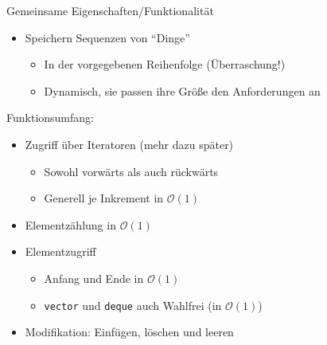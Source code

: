 \begin{frame}[fragile]{Gemeinsame Eigenschaften/Funktionalität}
	\begin{itemize}
		\item Speichern Sequenzen von \enquote{Dinge}
		\begin{itemize}
			\item In der vorgegebenen Reihenfolge (Überraschung!)
			\pause
			\item Dynamisch, sie passen ihre Größe den Anforderungen an
		\end{itemize}
	\end{itemize}
	
	\pause
	
	Funktionsumfang:
	\begin{itemize}
		\item Zugriff über Iteratoren (mehr dazu später)
		\begin{itemize}
			\item Sowohl vorwärts als auch rückwärts
			\item Generell je Inkrement in $\mathcal{O}(1)$
		\end{itemize}
		\item Elementzählung in $\mathcal{O}(1)$
		\item Elementzugriff
		\begin{itemize}
			\item Anfang und Ende in $\mathcal{O}(1)$
			\item \verb|vector| und \verb|deque| auch Wahlfrei (in $\mathcal{O}(1)$)
		\end{itemize}
		\item Modifikation: Einfügen, löschen und leeren
	\end{itemize}
\end{frame}

